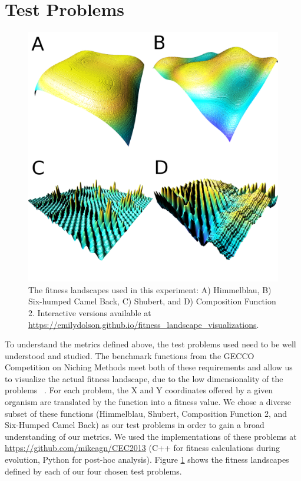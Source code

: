 \documentclass[letterpaper]{article}
\newcommand{\reduceCaptionPadding}{\setlength{\belowcaptionskip}{-10pt}}
\begin{document}
\section{Test Problems}
\begin{figure}
\includegraphics[width=\columnwidth]{figs/landscapes.png}
\reduceCaptionPadding
\caption{\small The fitness landscapes used in this experiment: A) Himmelblau, B) Six-humped Camel Back, C) Shubert, and D) Composition Function 2. Interactive versions available at \url{https://emilydolson.github.io/fitness_landscape_visualizations}.}
\label{fig:landscapes}
\end{figure}

To understand the metrics defined above, the test problems used need to be well understood and studied. The benchmark functions from the GECCO Competition on Niching Methods meet both of these requirements and allow us to visualize the actual fitness landscape, due to the low dimensionality of the problems ~\citep{li_benchmark_2013}. For each problem, the X and Y coordinates offered by a given organism are translated by the function into a fitness value. We chose a diverse subset of these functions (Himmelblau, Shubert, Composition Function 2, and Six-Humped Camel Back) as our test problems in order to gain a broad understanding of our metrics. We used the implementations of these problems at \url{https://github.com/mikeagn/CEC2013} (C++ for fitness calculations during evolution, Python for post-hoc analysis). Figure \ref{fig:landscapes} shows the fitness landscapes defined by each of our four chosen test problems. 
\end{document}
